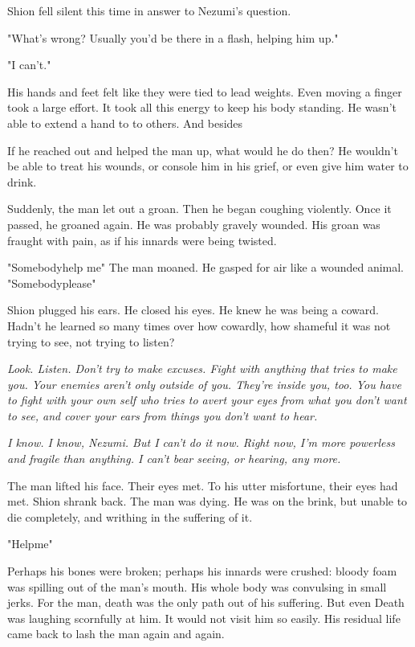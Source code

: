 Shion fell silent this time in answer to Nezumi's question.

"What's wrong? Usually you'd be there in a flash, helping him up."

"I can't."

His hands and feet felt like they were tied to lead weights. Even moving
a finger took a large effort. It took all this energy to keep his body
standing. He wasn't able to extend a hand to to others. And besides\el 

If he reached out and helped the man up, what would he do then? He
wouldn't be able to treat his wounds, or console him in his grief, or
even give him water to drink.

Suddenly, the man let out a groan. Then he began coughing violently.
Once it passed, he groaned again. He was probably gravely wounded. His
groan was fraught with pain, as if his innards were being twisted.

"Somebody\el help me\el " The man moaned. He gasped for air like a
wounded animal. "Somebody\el please\el "

Shion plugged his ears. He closed his eyes. He knew he was being a
coward. Hadn't he learned so many times over how cowardly, how shameful
it was not trying to see, not trying to listen?

\emph{Look. Listen. Don't try to make excuses. Fight with anything that tries
to make you. Your enemies aren't only outside of you. They're inside
you, too. You have to fight with your own self who tries to avert your
eyes from what you don't want to see, and cover your ears from things
you don't want to hear.}

\emph{I know. I know, Nezumi. But I can't do it now. Right now, I'm more
powerless and fragile than anything. I can't bear seeing, or hearing,
any more.}

The man lifted his face. Their eyes met. To his utter misfortune, their
eyes had met. Shion shrank back. The man was dying. He was on the brink,
but unable to die completely, and writhing in the suffering of it.

"Help\el me\el "

Perhaps his bones were broken; perhaps his innards were crushed: bloody
foam was spilling out of the man's mouth. His whole body was convulsing
in small jerks. For the man, death was the only path out of his
suffering. But even Death was laughing scornfully at him. It would not
visit him so easily. His residual life came back to lash the man again
and again.

